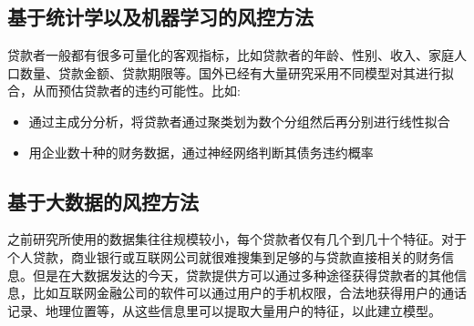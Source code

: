 \subsection{基于统计学以及机器学习的风控方法}
贷款者一般都有很多可量化的客观指标，比如贷款者的年龄、性别、收入、家庭人口数量、贷款金额、贷款期限等。国外已经有大量研究采用不同模型对其进行拟合，从而预估贷款者的违约可能性。比如: 
\begin{itemize}
	\item 通过主成分分析，将贷款者通过聚类划为数个分组然后再分别进行线性拟合\cite{2016konocreditrisk}
	\item 用企业数十种的财务数据，通过神经网络判断其债务违约概率\cite{angelini2008neural}
\end{itemize}
\subsection{基于大数据的风控方法}
之前研究所使用的数据集往往规模较小，每个贷款者仅有几个到几十个特征。对于个人贷款，商业银行或互联网公司就很难搜集到足够的与贷款直接相关的财务信息。但是在大数据发达的今天，贷款提供方可以通过多种途径获得贷款者的其他信息，比如互联网金融公司的软件可以通过用户的手机权限，合法地获得用户的通话记录、地理位置等，从这些信息里可以提取大量用户的特征，以此建立模型。